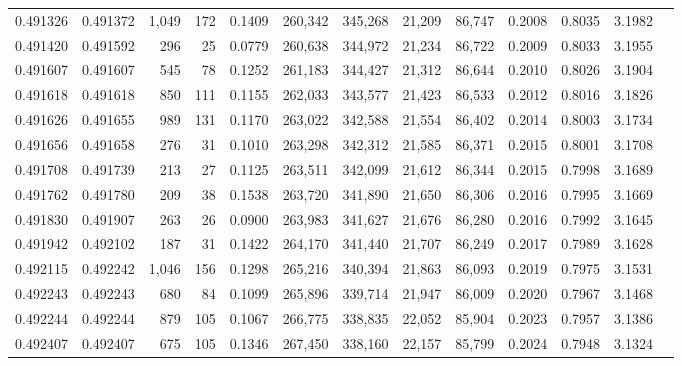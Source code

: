 \begin{tabular}{rrrrrrrrrrrrr}
0.491326 & 0.491372 & 1,049 &   172 &                                     0.1409 & 260,342 & 345,268 &  21,209 &  86,747 & 0.2008 & 0.8035 & 3.1982 \\
0.491420 & 0.491592 &   296 &    25 &                                     0.0779 & 260,638 & 344,972 &  21,234 &  86,722 & 0.2009 & 0.8033 & 3.1955 \\
0.491607 & 0.491607 &   545 &    78 &                                     0.1252 & 261,183 & 344,427 &  21,312 &  86,644 & 0.2010 & 0.8026 & 3.1904 \\
0.491618 & 0.491618 &   850 &   111 &                                     0.1155 & 262,033 & 343,577 &  21,423 &  86,533 & 0.2012 & 0.8016 & 3.1826 \\
0.491626 & 0.491655 &   989 &   131 &                                     0.1170 & 263,022 & 342,588 &  21,554 &  86,402 & 0.2014 & 0.8003 & 3.1734 \\
0.491656 & 0.491658 &   276 &    31 &                                     0.1010 & 263,298 & 342,312 &  21,585 &  86,371 & 0.2015 & 0.8001 & 3.1708 \\
0.491708 & 0.491739 &   213 &    27 &                                     0.1125 & 263,511 & 342,099 &  21,612 &  86,344 & 0.2015 & 0.7998 & 3.1689 \\
0.491762 & 0.491780 &   209 &    38 &                                     0.1538 & 263,720 & 341,890 &  21,650 &  86,306 & 0.2016 & 0.7995 & 3.1669 \\
0.491830 & 0.491907 &   263 &    26 &                                     0.0900 & 263,983 & 341,627 &  21,676 &  86,280 & 0.2016 & 0.7992 & 3.1645 \\
0.491942 & 0.492102 &   187 &    31 &                                     0.1422 & 264,170 & 341,440 &  21,707 &  86,249 & 0.2017 & 0.7989 & 3.1628 \\
0.492115 & 0.492242 & 1,046 &   156 &                                     0.1298 & 265,216 & 340,394 &  21,863 &  86,093 & 0.2019 & 0.7975 & 3.1531 \\
0.492243 & 0.492243 &   680 &    84 &                                     0.1099 & 265,896 & 339,714 &  21,947 &  86,009 & 0.2020 & 0.7967 & 3.1468 \\
0.492244 & 0.492244 &   879 &   105 &                                     0.1067 & 266,775 & 338,835 &  22,052 &  85,904 & 0.2023 & 0.7957 & 3.1386 \\
0.492407 & 0.492407 &   675 &   105 &                                     0.1346 & 267,450 & 338,160 &  22,157 &  85,799 & 0.2024 & 0.7948 & 3.1324 \\

\end{tabular}

